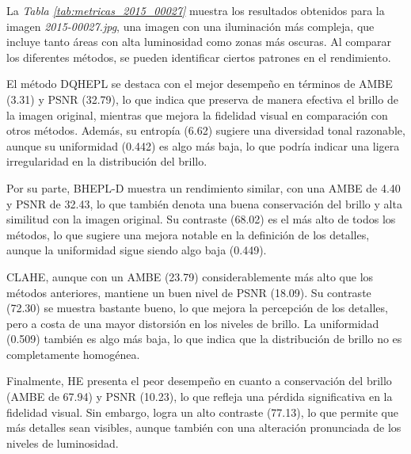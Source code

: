 \documentclass[sigchi]{acmart}
\begin{document}
La \emph{Tabla \ref{tab:metricas_2015_00027}} muestra los resultados obtenidos para la imagen
\emph{2015-00027.jpg}, una imagen con una iluminación más compleja, que incluye tanto áreas con alta
luminosidad como zonas más oscuras. Al comparar los diferentes métodos, se pueden identificar
ciertos patrones en el rendimiento.

El método DQHEPL se destaca con el mejor desempeño en términos de AMBE (3.31) y PSNR (32.79), lo que indica que preserva de manera efectiva el brillo de la imagen original, mientras
que mejora la fidelidad visual en comparación con otros métodos. Además, su entropía (6.62)
sugiere una diversidad tonal razonable, aunque su uniformidad (0.442) es algo más baja, lo que
podría indicar una ligera irregularidad en la distribución del brillo.

Por su parte, BHEPL-D muestra un rendimiento similar, con una AMBE de 4.40 y PSNR de 32.43,
lo que también denota una buena conservación del brillo y alta similitud con la imagen
original. Su contraste (68.02) es el más alto de todos los métodos, lo que sugiere una mejora
notable en la definición de los detalles, aunque la uniformidad sigue siendo algo baja (0.449).

CLAHE, aunque con un AMBE (23.79) considerablemente más alto que los métodos anteriores,
mantiene un buen nivel de PSNR (18.09). Su contraste (72.30) se muestra bastante bueno, lo
que mejora la percepción de los detalles, pero a costa de una mayor distorsión en los niveles
de brillo. La uniformidad (0.509) también es algo más baja, lo que indica que la distribución
de brillo no es completamente homogénea.

Finalmente, HE presenta el peor desempeño en cuanto a conservación del brillo (AMBE de 67.94) y
PSNR (10.23), lo que refleja una pérdida significativa en la fidelidad visual. Sin embargo,
logra un alto contraste (77.13), lo que permite que más detalles sean visibles, aunque también
con una alteración pronunciada de los niveles de luminosidad.
\end{document}
